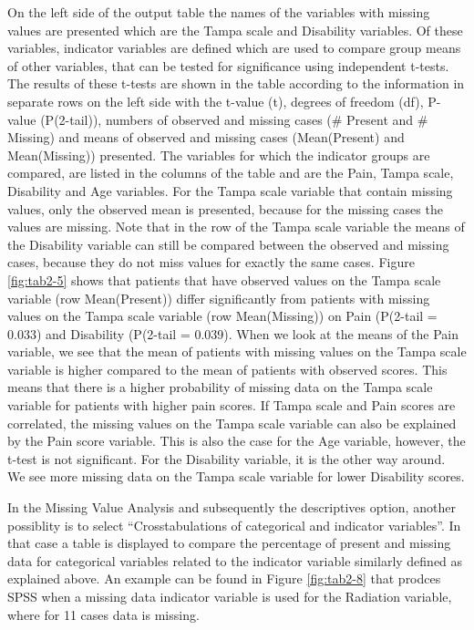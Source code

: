 \documentclass[]{book}
\begin{document}
On the left side of the output table the names of the variables with
missing values are presented which are the Tampa scale and Disability
variables. Of these variables, indicator variables are defined which are
used to compare group means of other variables, that can be tested for
significance using independent t-tests. The results of these t-tests are
shown in the table according to the information in separate rows on the
left side with the t-value (t), degrees of freedom (df), P-value
(P(2-tail)), numbers of observed and missing cases (\# Present and \#
Missing) and means of observed and missing cases (Mean(Present) and
Mean(Missing)) presented. The variables for which the indicator groups
are compared, are listed in the columns of the table and are the Pain,
Tampa scale, Disability and Age variables. For the Tampa scale variable
that contain missing values, only the observed mean is presented,
because for the missing cases the values are missing. Note that in the
row of the Tampa scale variable the means of the Disability variable can
still be compared between the observed and missing cases, because they
do not miss values for exactly the same cases. Figure \ref{fig:tab2-5}
shows that patients that have observed values on the Tampa scale
variable (row Mean(Present)) differ significantly from patients with
missing values on the Tampa scale variable (row Mean(Missing)) on Pain
(P(2-tail = 0.033) and Disability (P(2-tail = 0.039). When we look at
the means of the Pain variable, we see that the mean of patients with
missing values on the Tampa scale variable is higher compared to the
mean of patients with observed scores. This means that there is a higher
probability of missing data on the Tampa scale variable for patients
with higher pain scores. If Tampa scale and Pain scores are correlated,
the missing values on the Tampa scale variable can also be explained by
the Pain score variable. This is also the case for the Age variable,
however, the t-test is not significant. For the Disability variable, it
is the other way around. We see more missing data on the Tampa scale
variable for lower Disability scores.

In the Missing Value Analysis and subsequently the descriptives option,
another possiblity is to select ``Crosstabulations of categorical and
indicator variables''. In that case a table is displayed to compare the
percentage of present and missing data for categorical variables related
to the indicator variable similarly defined as explained above. An
example can be found in Figure \ref{fig:tab2-8} that prodces SPSS when a
missing data indicator variable is used for the Radiation variable,
where for 11 cases data is missing.
\end{document}
